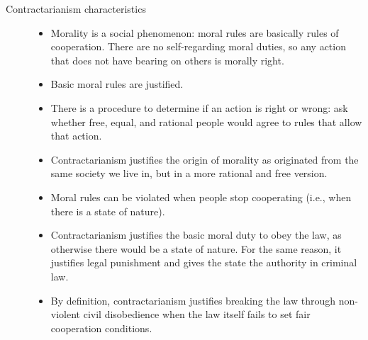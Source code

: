 \begin{description}
    \item[Contractarianism characteristics] \phantom{} 
        \begin{itemize}
            \item Morality is a social phenomenon: moral rules are basically rules of cooperation. There are no self-regarding moral duties, so any action that does not have bearing on others is morally right.
            \item Basic moral rules are justified.
            \item There is a procedure to determine if an action is right or wrong: ask whether free, equal, and rational people would agree to rules that allow that action.
            \item Contractarianism justifies the origin of morality as originated from the same society we live in, but in a more rational and free version.
            \item Moral rules can be violated when people stop cooperating (i.e., when there is a state of nature).
            \item Contractarianism justifies the basic moral duty to obey the law, as otherwise there would be a state of nature. For the same reason, it justifies legal punishment and gives the state the authority in criminal law.
            \item By definition, contractarianism justifies breaking the law through non-violent civil disobedience when the law itself fails to set fair cooperation conditions.
        \end{itemize}
\end{description}


